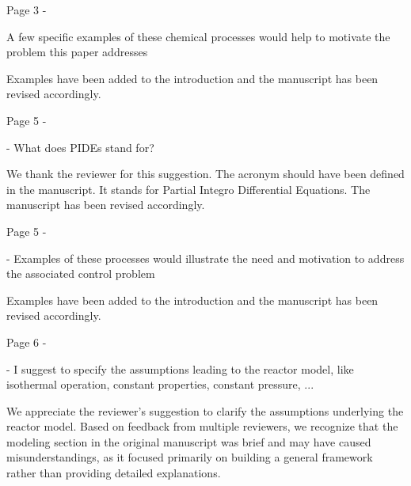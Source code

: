 \documentclass[11pt,answers]{exam}
\begin{document}
\begin{questions}

    \question Page 3 - 

    A few specific examples of these chemical processes would help to motivate the problem this paper addresses

    \begin{solutionorbox} \label{comment:1_1}
        Examples have been added to the introduction and the manuscript has been revised accordingly.
    \end{solutionorbox}

    \question Page 5 - 

    - What does PIDEs stand for?

    \begin{solutionorbox} \label{comment:1_2}
        We thank the reviewer for this suggestion. The acronym should have been defined in the manuscript. It stands for Partial Integro Differential Equations. The manuscript has been revised accordingly.
    \end{solutionorbox}


    \question Page 5 - 

    - Examples of these processes would illustrate the need and motivation to address the associated
    control problem

    \begin{solutionorbox} \label{comment:1_3}
        Examples have been added to the introduction and the manuscript has been revised accordingly.
    \end{solutionorbox}


    \question Page 6 - 

    - I suggest to specify the assumptions leading to the reactor model, like isothermal operation,
    constant properties, constant pressure, ...

    \begin{solutionorbox} \label{comment:1_4}
        We appreciate the reviewer’s suggestion to clarify the assumptions underlying the reactor model. Based on feedback from multiple reviewers, we recognize that the modeling section in the original manuscript was brief and may have caused misunderstandings, as it focused primarily on building a general framework rather than providing detailed explanations.


\end{solutionorbox}
\end{questions}
\end{document}
